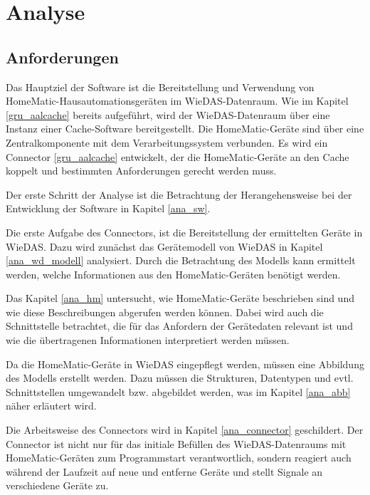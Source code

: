 
\chapter{Analyse}
\label{analyse}

\section{Anforderungen}
\label{ana_anforderungen}

Das Hauptziel der Software ist die Bereitstellung und Verwendung von HomeMatic-Hausautomationsgeräten
im WieDAS-Datenraum.
Wie im Kapitel \ref{gru_aalcache} bereits aufgeführt, wird der WieDAS-Datenraum über eine Instanz
einer Cache-Software bereitgestellt.
Die HomeMatic-Geräte sind über eine Zentralkomponente mit dem Verarbeitungssystem verbunden.
Es wird ein Connector \ref{gru_aalcache} entwickelt, der die HomeMatic-Geräte an den Cache koppelt
und bestimmten Anforderungen gerecht werden muss.

Der erste Schritt der Analyse ist die Betrachtung der Herangehensweise bei der Entwicklung der
Software in Kapitel \ref{ana_sw}.

Die erste Aufgabe des Connectors, ist die Bereitstellung der ermittelten Geräte in WieDAS.
Dazu wird zunächst das Gerätemodell von WieDAS in Kapitel \ref{ana_wd_modell} analysiert.
Durch die Betrachtung des Modells kann ermittelt werden, welche Informationen aus den HomeMatic-Geräten
benötigt werden.

Das Kapitel \ref{ana_hm} untersucht, wie HomeMatic-Geräte beschrieben sind und wie diese
Beschreibungen abgerufen werden können.
Dabei wird auch die Schnittstelle betrachtet, die für das Anfordern der Gerätedaten relevant ist und
wie die übertragenen Informationen interpretiert werden müssen.

Da die HomeMatic-Geräte in WieDAS eingepflegt werden, müssen eine Abbildung des Modells erstellt werden.
Dazu müssen die Strukturen, Datentypen und evtl. Schnittstellen umgewandelt bzw. abgebildet werden,
was im Kapitel \ref{ana_abb} näher erläutert wird.

Die Arbeitsweise des Connectors wird in Kapitel \ref{ana_connector} geschildert.
Der Connector ist nicht nur für das initiale Befüllen des WieDAS-Datenraums mit HomeMatic-Geräten
zum Programmstart verantwortlich, sondern reagiert auch während der Laufzeit auf neue und entferne Geräte
und stellt Signale an verschiedene Geräte zu.

